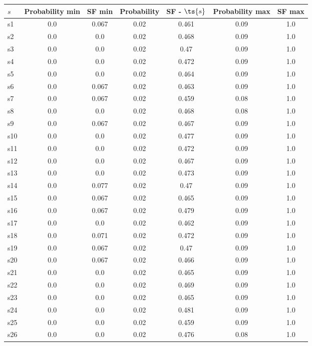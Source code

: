 \documentclass{article}
\begin{document}
\noindent\begin{tabular}{|l|c|c|c|c|c|c|}
\hline
$s$& Probability min & SF min & Probability & SF - $\ts{s}$ & Probability max & SF max\\
\hline
s1 &0.0 & 0.067 & 0.02 & 0.461 & 0.09 & 1.0\\
\hline
s2 &0.0 & 0.0 & 0.02 & 0.468 & 0.09 & 1.0\\
\hline
s3 &0.0 & 0.0 & 0.02 & 0.47 & 0.09 & 1.0\\
\hline
s4 &0.0 & 0.0 & 0.02 & 0.472 & 0.09 & 1.0\\
\hline
s5 &0.0 & 0.0 & 0.02 & 0.464 & 0.09 & 1.0\\
\hline
s6 &0.0 & 0.067 & 0.02 & 0.463 & 0.09 & 1.0\\
\hline
s7 &0.0 & 0.067 & 0.02 & 0.459 & 0.08 & 1.0\\
\hline
s8 &0.0 & 0.0 & 0.02 & 0.468 & 0.08 & 1.0\\
\hline
s9 &0.0 & 0.067 & 0.02 & 0.467 & 0.09 & 1.0\\
\hline
s10 &0.0 & 0.0 & 0.02 & 0.477 & 0.09 & 1.0\\
\hline
s11 &0.0 & 0.0 & 0.02 & 0.472 & 0.09 & 1.0\\
\hline
s12 &0.0 & 0.0 & 0.02 & 0.467 & 0.09 & 1.0\\
\hline
s13 &0.0 & 0.0 & 0.02 & 0.473 & 0.09 & 1.0\\
\hline
s14 &0.0 & 0.077 & 0.02 & 0.47 & 0.09 & 1.0\\
\hline
s15 &0.0 & 0.067 & 0.02 & 0.465 & 0.09 & 1.0\\
\hline
s16 &0.0 & 0.067 & 0.02 & 0.479 & 0.09 & 1.0\\
\hline
s17 &0.0 & 0.0 & 0.02 & 0.462 & 0.09 & 1.0\\
\hline
s18 &0.0 & 0.071 & 0.02 & 0.472 & 0.09 & 1.0\\
\hline
s19 &0.0 & 0.067 & 0.02 & 0.47 & 0.09 & 1.0\\
\hline
s20 &0.0 & 0.067 & 0.02 & 0.466 & 0.09 & 1.0\\
\hline
s21 &0.0 & 0.0 & 0.02 & 0.465 & 0.09 & 1.0\\
\hline
s22 &0.0 & 0.0 & 0.02 & 0.469 & 0.09 & 1.0\\
\hline
s23 &0.0 & 0.0 & 0.02 & 0.465 & 0.09 & 1.0\\
\hline
s24 &0.0 & 0.0 & 0.02 & 0.481 & 0.09 & 1.0\\
\hline
s25 &0.0 & 0.0 & 0.02 & 0.459 & 0.09 & 1.0\\
\hline
s26 &0.0 & 0.0 & 0.02 & 0.476 & 0.08 & 1.0\\

\end{tabular}
\end{document}
